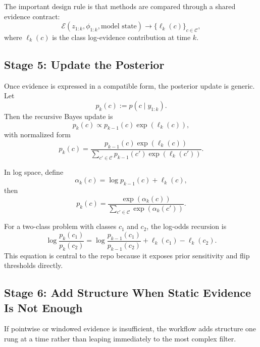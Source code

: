 \documentclass[11pt]{article}
\begin{document}
The important design rule is that methods are compared through a shared evidence contract:
\begin{equation}
\mathcal{E}(z_{1:k}, \phi_{1:k}, \text{model state}) \rightarrow \{\ell_k(c)\}_{c \in \mathcal{C}},
\end{equation}
where \(\ell_k(c)\) is the class log-evidence contribution at time \(k\).

\subsection{Stage 5: Update the Posterior}
Once evidence is expressed in a compatible form, the posterior update is generic. Let
\begin{equation}
p_{k}(c) := p(c \mid y_{1:k}).
\end{equation}
Then the recursive Bayes update is
\begin{equation}
p_k(c) \propto p_{k-1}(c) \exp(\ell_k(c)),
\end{equation}
with normalized form
\begin{equation}
p_k(c) =
\frac{p_{k-1}(c) \exp(\ell_k(c))}
{\sum_{c' \in \mathcal{C}} p_{k-1}(c') \exp(\ell_k(c'))}.
\end{equation}

In log space, define
\begin{equation}
\alpha_k(c) = \log p_{k-1}(c) + \ell_k(c),
\end{equation}
then
\begin{equation}
p_k(c) = \frac{\exp(\alpha_k(c))}
{\sum_{c' \in \mathcal{C}} \exp(\alpha_k(c'))}.
\end{equation}

For a two-class problem with classes \(c_1\) and \(c_2\), the log-odds recursion is
\begin{equation}
\log \frac{p_k(c_1)}{p_k(c_2)}
=
\log \frac{p_{k-1}(c_1)}{p_{k-1}(c_2)}
+
\ell_k(c_1) - \ell_k(c_2).
\end{equation}
This equation is central to the repo because it exposes prior sensitivity and flip thresholds directly.

\subsection{Stage 6: Add Structure When Static Evidence Is Not Enough}
If pointwise or windowed evidence is insufficient, the workflow adds structure one rung at a time rather than leaping immediately to the most complex filter.
\end{document}
